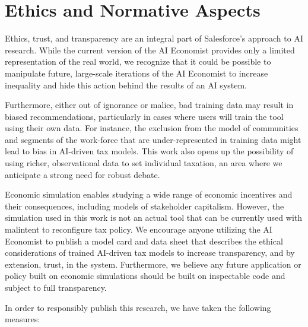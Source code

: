 \section{Ethics and Normative Aspects}
\label{sec:ethics}
Ethics, trust, and transparency are an integral part of Salesforce’s approach to AI research.
While the current version of the AI Economist provides only a limited representation of the real world, we recognize that it could be possible to manipulate future, large-scale iterations of the AI Economist to increase inequality and hide this action behind the results of an AI system.

Furthermore, either out of ignorance or malice, bad training data may result in biased recommendations, particularly in cases where users will train the tool using their own data. For instance, the exclusion from the model of communities and segments of the work-force that are under-represented in training data might lead to bias in AI-driven tax models. This work also opens up the possibility of using richer, observational data to set individual taxation, an area where we anticipate a strong need for robust debate.


Economic simulation enables studying a wide range of economic incentives and their consequences, including models of stakeholder capitalism.
However, the simulation used in this work is not an actual tool that can be currently used with malintent to reconfigure tax policy.
We encourage anyone utilizing the AI Economist to publish a model card and data sheet that describes the ethical considerations of trained AI-driven tax models to increase transparency, and by extension, trust, in the system.
Furthermore, we believe any future application or policy built on economic simulations should be built on inspectable code and subject to full transparency.

In order to responsibly publish this research, we have taken the following measures:

